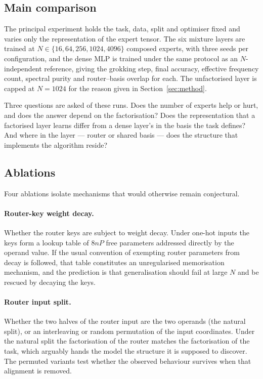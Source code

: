\subsection{Main comparison}

The principal experiment holds the task, data, split and optimiser fixed and
varies only the representation of the expert tensor. The six mixture layers are trained at $N \in \{16, 64, 256, 1024, 4096\}$
composed experts, with three seeds per configuration, and the dense MLP is
trained under the same protocol as an $N$-independent reference, giving the
grokking step, final accuracy, effective frequency count, spectral purity and
router--basis overlap for each. The
unfactorised layer is capped at $N = 1024$ for the reason given in
Section~\ref{sec:method}.

Three questions are asked of these runs. Does the number of experts help or
hurt, and does the answer depend on the factorisation? Does the representation
that a factorised layer learns differ from a dense layer's in the basis the
task defines? And where in the layer --- router or shared basis --- does the
structure that implements the algorithm reside?

\subsection{Ablations}
\label{sec:ablations}

Four ablations isolate mechanisms that would otherwise remain conjectural.

\paragraph{Router-key weight decay.} Whether the router keys are subject to
weight decay. Under one-hot inputs the keys form a lookup table of $8 n P$
free parameters addressed directly by the operand value. If the usual
convention of exempting router parameters from decay is followed, that table
constitutes an unregularised memorisation mechanism, and the prediction is
that generalisation should fail at large $N$ and be rescued by decaying the
keys.

\paragraph{Router input split.} Whether the two halves of the router input are
the two operands (the natural split), or an interleaving or random permutation
of the input coordinates. Under the natural split the factorisation of the
router matches the factorisation of the task, which arguably hands the model
the structure it is supposed to discover. The permuted variants test whether
the observed behaviour survives when that alignment is removed.

